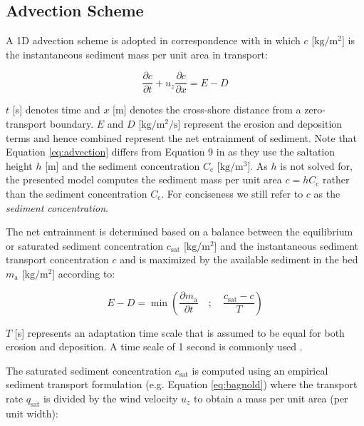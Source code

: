 \subsection{Advection Scheme}

A 1D advection scheme is adopted in correspondence with
\citet{deVries2014a} in which $c$ [$\mathrm{kg/m^2}$] is the
instantaneous sediment mass per unit area in transport:

\begin{equation}
  \label{eq:advection}
  \frac{\partial c}{\partial t} + u_z \frac{\partial c}{\partial x} = E - D
\end{equation}

\noindent $t$ [s] denotes time and $x$ [m] denotes the cross-shore
distance from a zero-transport boundary. $E$ and $D$
[$\mathrm{kg/m^2/s}$] represent the erosion and deposition terms and
hence combined represent the net entrainment of sediment. Note that
Equation \ref{eq:advection} differs from Equation 9 in
\citet{deVries2014a} as they use the saltation height $h$ [m] and the
sediment concentration $C_{\mathrm{c}}$ [$\mathrm{kg/m^3}$]. As $h$ is
not solved for, the presented model computes the sediment mass per
unit area $c = h C_{\mathrm{c}}$ rather than the sediment
concentration $C_{\mathrm{c}}$. For conciseness we still refer to $c$
as the \emph{sediment concentration}.

The net entrainment is determined based on a balance between the
equilibrium or saturated sediment concentration $c_{\mathrm{sat}}$
[$\mathrm{kg/m^2}$] and the instantaneous sediment transport
concentration $c$ and is maximized by the available sediment in the
bed $m_{\mathrm{a}}$ [$\mathrm{kg/m^2}$] according to:

\begin{equation}
  \label{eq:erodep}
  E - D = \min \left ( \frac{\partial m_{\mathrm{a}}}{\partial t} \quad ; \quad \frac{c_{\mathrm{sat}} - c}{T} \right )
\end{equation}

\noindent $T$ [s] represents an adaptation time scale that is assumed
to be equal for both erosion and deposition. A time scale of 1 second
is commonly used \citep{deVries2014a}.

The saturated sediment concentration $c_{\mathrm{sat}}$ is computed using an
empirical sediment transport formulation (e.g. Equation
\ref{eq:bagnold}) where the transport rate $q_{\mathrm{sat}}$ is divided by the
wind velocity $u_z$ to obtain a mass per unit area (per unit width):

